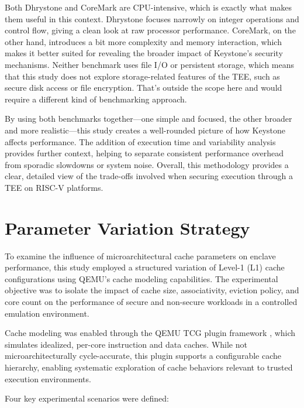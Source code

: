 Both Dhrystone and CoreMark are CPU-intensive, which is exactly what makes them useful in this context. Dhrystone focuses narrowly on integer operations and control flow, giving a clean look at raw processor performance. CoreMark, on the other hand, introduces a bit more complexity and memory interaction, which makes it better suited for revealing the broader impact of Keystone’s security mechanisms. Neither benchmark uses file I/O or persistent storage, which means that this study does not explore storage-related features of the TEE, such as secure disk access or file encryption. That’s outside the scope here and would require a different kind of benchmarking approach.

By using both benchmarks together—one simple and focused, the other broader and more realistic—this study creates a well-rounded picture of how Keystone affects performance. The addition of execution time and variability analysis provides further context, helping to separate consistent performance overhead from sporadic slowdowns or system noise. Overall, this methodology provides a clear, detailed view of the trade-offs involved when securing execution through a TEE on RISC-V platforms.

\section{Parameter Variation Strategy}
\label{sec:param-variation}

To examine the influence of microarchitectural cache parameters on enclave performance, this study employed a structured variation of Level-1 (L1) cache configurations using QEMU's cache modeling capabilities. The experimental objective was to isolate the impact of cache size, associativity, eviction policy, and core count on the performance of secure and non-secure workloads in a controlled emulation environment.

Cache modeling was enabled through the QEMU TCG plugin framework \cite{mandour2021cache}, which simulates idealized, per-core instruction and data caches. While not microarchitecturally cycle-accurate, this plugin supports a configurable cache hierarchy, enabling systematic exploration of cache behaviors relevant to trusted execution environments.

Four key experimental scenarios were defined:

